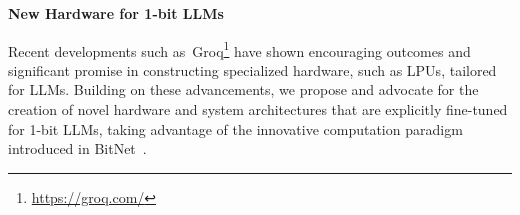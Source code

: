 \textbf{New Hardware for 1-bit LLMs}

Recent developments such as~Groq\footnote{\url{https://groq.com/}} have shown encouraging outcomes and significant promise in constructing specialized hardware, such as LPUs, tailored for LLMs. Building on these advancements, we propose and advocate for the creation of novel hardware and system architectures that are explicitly fine-tuned for 1-bit LLMs, taking advantage of the innovative computation paradigm introduced in BitNet~\cite{bitnet}.

